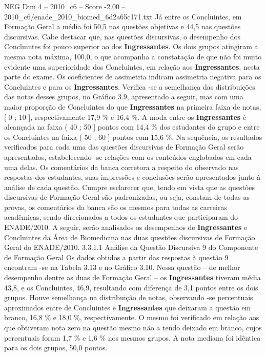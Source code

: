 \begin{textsample}{NEG Dim 4 – 2010\_c6 – Score -2.00 – 2010\_c6/enade\_2010\_biomed\_6d2a65c171.txt}
Já entre os Concluintes, em Formação Geral a média foi 50,5 nas questões objetivas e 44,5 nas questões discursivas.
Cabe destacar que, nas questões discursivas, o desempenho dos Concluintes foi pouco superior ao dos \textbf{Ingressantes}.
Os dois grupos atingiram a mesma nota máxima, 100,0, o que acompanha a constatação de que não foi muito evidente uma superioridade dos Concluintes, em relação aos \textbf{Ingressantes}, nesta parte do exame.
Os coeficientes de assimetria indicam assimetria negativa para os Concluintes e para os \textbf{Ingressantes}.
Verifica -se a semelhança das distribuições das notas desses grupos, no Gráfico 3.9, apresentado a seguir, mas com uma maior proporção de Concluintes do que \textbf{Ingressantes} na primeira faixa de notas, [ 0 ; 10 ], respectivamente 17,9 \% e 16,4 \%.
A moda entre os \textbf{Ingressantes} é alcançada na faixa ( 40 ; 50 ] pontos com 14,4 \% dos estudantes do grupo e entre os Concluintes na faixa ( 50 ; 60 ] pontos com 15,6 \%.
Na sequência, os resultados verificados para cada uma das questões discursivas de Formação Geral serão apresentados, estabelecendo -se relações com os conteúdos englobados em cada uma delas.
Os comentários da banca corretora a respeito do observado nas respostas dos estudantes, suas impressões e conclusões serão apresentados junto à análise de cada questão.
Cumpre esclarecer que, tendo em vista que as questões discursivas de Formação Geral são padronizadas, ou seja, constam de todas as provas, os comentários da banca são os mesmos para todas as carreiras acadêmicas, sendo direcionados a todos os estudantes que participaram do ENADE/2010.
A seguir, serão analisados os desempenhos de \textbf{Ingressantes} e Concluintes da Área de Biomedicina nas duas questões discursivas de Formação Geral do ENADE/2010. 3.3.1.1 Análise da Questão Discursiva 9 do Componente de Formação Geral Os dados obtidos a partir das respostas à questão 9 encontram -se na Tabela 3.13 e no Gráfico 3.10.
Nessa questão – de melhor desempenho dentre as duas de Formação Geral – os \textbf{Ingressantes} tiveram média 43,8, e os Concluintes, 46,9, resultando com diferença de 3,1 pontos entre os dois grupos.
Houve semelhança na distribuição de notas, observando -se percentuais aproximados entre de Concluintes e \textbf{Ingressantes} que deixaram a questão em branco, 16,8 \% e 18,0 \%, respectivamente.
O mesmo foi verificado em relação aos que obtiveram nota zero na questão mesmo não a tendo deixado em branco, cujos percentuais foram 1,7 \% e 1,6 \% nos mesmos grupos.
A nota mediana foi idêntica para os dois grupos, 50,0 pontos.

\end{textsample}
